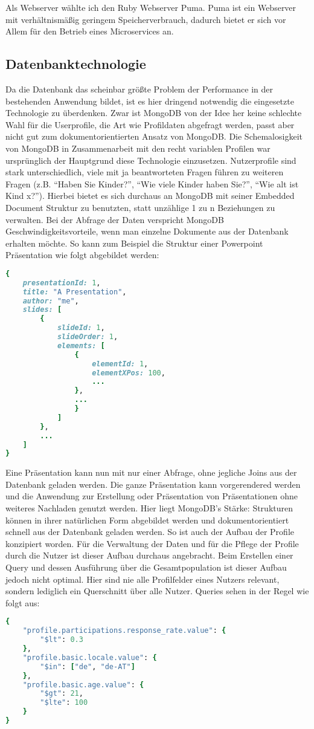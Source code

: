 Als Webserver wählte ich den Ruby Webserver Puma\cite{puma}. Puma ist ein Webserver mit verhältnismäßig geringem Speicherverbrauch, dadurch bietet er sich vor Allem für den Betrieb eines Microservices an.

\subsection{Datenbanktechnologie}
Da die Datenbank das scheinbar größte Problem der Performance in der bestehenden Anwendung bildet, ist es hier dringend notwendig die eingesetzte Technologie zu überdenken. Zwar ist MongoDB von der Idee her keine schlechte Wahl für die Userprofile, die Art wie Profildaten abgefragt werden, passt aber nicht gut zum dokumentorientierten Ansatz von MongoDB.
Die Schemalosigkeit von MongoDB in Zusammenarbeit mit den recht variablen Profilen war ursprünglich der Hauptgrund diese Technologie einzusetzen. Nutzerprofile sind stark unterschiedlich, viele mit ja beantworteten Fragen führen zu weiteren Fragen (z.B. ``Haben Sie Kinder?'', ``Wie viele Kinder haben Sie?'', ``Wie alt ist Kind x?''). Hierbei bietet es sich durchaus an MongoDB mit seiner Embedded Document Struktur zu benutzten, statt unzählige 1 zu n Beziehungen zu verwalten.
Bei der Abfrage der Daten verspricht MongoDB Geschwindigkeitsvorteile, wenn man einzelne Dokumente aus der Datenbank erhalten möchte. So kann zum Beispiel die Struktur einer Powerpoint Präsentation wie folgt abgebildet werden:
\begin{lstlisting}[language=Ruby]
{
    presentationId: 1,
    title: "A Presentation",
    author: "me",
    slides: [
        {
            slideId: 1,
            slideOrder: 1,
            elements: [
                {
                    elementId: 1,
                    elementXPos: 100,
                    ...
                },
                ...
                }
            ]
        },
        ...
    ]
}
\end{lstlisting}
Eine Präsentation kann nun mit nur einer Abfrage, ohne jegliche Joins aus der Datenbank geladen werden. Die ganze Präsentation kann vorgerendered werden und die Anwendung zur Erstellung oder Präsentation von Präsentationen ohne weiteres Nachladen genutzt werden. Hier liegt MongoDB's Stärke: Strukturen können in ihrer natürlichen Form abgebildet werden und dokumentorientiert schnell aus der Datenbank geladen werden.
So ist auch der Aufbau der Profile konzipiert worden. Für die Verwaltung der Daten und für die Pflege der Profile durch die Nutzer ist dieser Aufbau durchaus angebracht.
Beim Erstellen einer Query und dessen Ausführung über die Gesamtpopulation ist dieser Aufbau jedoch nicht optimal. Hier sind nie alle Profilfelder eines Nutzers relevant, sondern lediglich ein Querschnitt über alle Nutzer. Queries sehen in der Regel wie folgt aus:
\begin{lstlisting}[language=Ruby]
{
    "profile.participations.response_rate.value": {
        "$lt": 0.3
    },
    "profile.basic.locale.value": {
        "$in": ["de", "de-AT"]
    },
    "profile.basic.age.value": {
        "$gt": 21,
        "$lte": 100
    }
}
\end{lstlisting}

